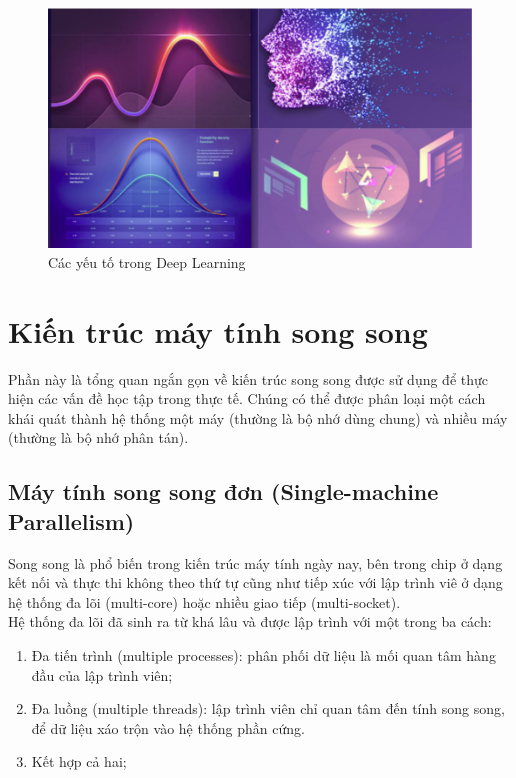 \documentclass[11pt,a4paper]{article}
\numberwithin{equation}{subsection}
\numberwithin{figure}{subsection}
\numberwithin{table}{subsection}
\begin{document}
\begin{figure}[!h]
\begin{center}
\includegraphics[scale=0.7]{Deep_save.png}
\end{center}
\caption{Các yếu tố trong Deep Learning}
\end{figure}
\newpage
\section{Kiến trúc máy tính song song}
Phần này là tổng quan ngắn gọn về kiến trúc song song được sử dụng để thực hiện các vấn đề học tập trong thực tế. Chúng có thể được phân loại một cách khái quát thành hệ thống một máy (thường là bộ nhớ dùng chung) và nhiều máy (thường là bộ nhớ phân tán).

\subsection{Máy tính song song đơn (Single-machine Parallelism)}
Song song là phổ biến trong kiến trúc máy tính ngày nay, bên trong chip ở dạng kết nối và thực thi không theo thứ tự cũng như tiếp xúc với lập trình viê ở dạng hệ thống đa lõi (multi-core) hoặc nhiều giao tiếp (multi-socket).\\

Hệ thống đa lõi đã sinh ra từ khá lâu và được lập trình với một trong ba cách:
\begin{enumerate}[-]
	\item Đa tiến trình (multiple processes): phân phối dữ liệu là mối quan tâm hàng đầu của lập trình viên;
	\item Đa luồng (multiple threads): lập trình viên chỉ quan tâm đến tính song song, để dữ liệu xáo trộn vào hệ thống phần cứng.
	\item Kết hợp cả hai;
\end{enumerate}
\end{document}
